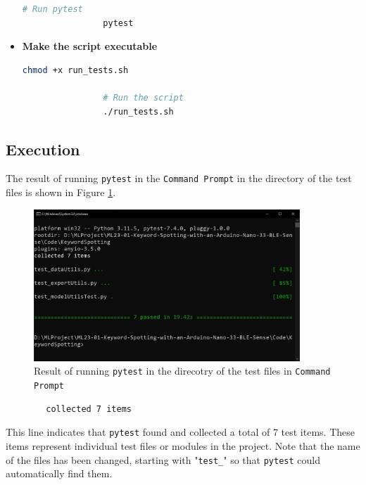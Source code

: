 \begin{itemize}
\begin{lstlisting}[language=Python, caption={Bash Script for Running Pytest in a Specific Directory}, label={code:run-pytest-bash}, style=pythonstyle]
				# Run pytest
				pytest
			\end{lstlisting}
			
				
				\item \textbf{Make the script executable}
				
			\begin{lstlisting}[language=Bash, caption={Setting Executable Permission and Running the Script}, label={code:set-permission-and-run}, style=bashstyle]
				chmod +x run_tests.sh
				
				# Run the script
				./run_tests.sh
			\end{lstlisting}
			
			\end{itemize}
	\subsection{Execution}
	
	The result of running \texttt{pytest} in the \texttt{Command Prompt} in the directory of the test files is shown in Figure \ref{fig:pytestResult}.
	
	\begin{figure}[h!]
		\centering
		\includegraphics[width=100mm]{Images/Programming/pytestResult}
		\caption{Result of running \texttt{pytest} in the direcotry of the test files in \texttt{Command Prompt}} 
		\label{fig:pytestResult}
	\end{figure}
	
	\begin{verbatim}
		collected 7 items
	\end{verbatim}
	
	This line indicates that \texttt{pytest} found and collected a total of 7 test items. These items represent individual test files or modules in the project. Note that the name of the files has been changed, starting with "\texttt{test\_}" so that \texttt{pytest} could automatically find them.
	
